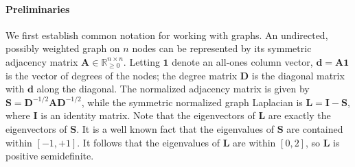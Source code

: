 \documentclass{article}
\begin{document}
\paragraph{Preliminaries} We first establish common notation for working with graphs. 
An undirected, possibly weighted graph on $n$ nodes can be represented by its symmetric adjacency matrix $\bm{A} \in \mathbb{R}_{\geq 0}^{n \times n}$.
Letting $\bm{1}$ denote an all-ones column vector, $\bm{d} = \bm{A}\bm{1}$ is the vector of degrees of the nodes; the degree matrix $\bm{D}$ is the diagonal matrix with $\bm{d}$ along the diagonal. The normalized adjacency matrix is given by $\bm{S} = \bm{D}^{-1/2} \bm{A} \bm{D}^{-1/2}$, while the symmetric normalized graph Laplacian is $\bm{L} = \bm{I} - \bm{S}$, where $\bm{I}$ is an identity matrix. Note that the eigenvectors of $\bm{L}$ are exactly the eigenvectors of $\bm{S}$. It is a well known fact that the eigenvalues of $\bm{S}$ are contained within $[-1,+1]$. It follows that the eigenvalues of $\bm{L}$ are within $[0,2]$, so $\bm{L}$ is positive semidefinite.
\end{document}
